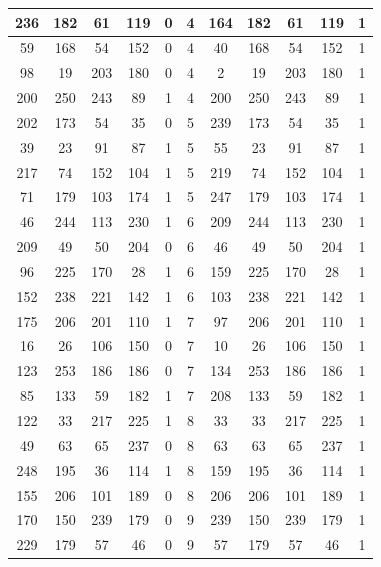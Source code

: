\documentclass[12pt]{jreport}
\begin{document}
\begin{table}[H]
\begin{center}
\begin{tabular} {|c|c|c|c|c|c|c|c|c|c|c|}
                    236 & 182 & 61 & 119 & 0 & 4 & 164 & 182 & 61 & 119 & 1 \\ \hline
                    59 & 168 & 54 & 152 & 0 & 4 & 40 & 168 & 54 & 152 & 1 \\ \hline
                    98 & 19 & 203 & 180 & 0 & 4 & 2 & 19 & 203 & 180 & 1 \\ \hline
                    200 & 250 & 243 & 89 & 1 & 4 & 200 & 250 & 243 & 89 & 1 \\ \hline

                    202 & 173 & 54 & 35 & 0 & 5 & 239 & 173 & 54 & 35 & 1 \\ \hline
                    39 & 23 & 91 & 87 & 1 & 5 & 55 & 23 & 91 & 87 & 1 \\ \hline
                    217 & 74 & 152 & 104 & 1 & 5 & 219 & 74 & 152 & 104 & 1 \\ \hline
                    71 & 179 & 103 & 174 & 1 & 5 & 247 & 179 & 103 & 174 & 1 \\ \hline

                    46 & 244 & 113 & 230 & 1 & 6 & 209 & 244 & 113 & 230 & 1 \\ \hline
                    209 & 49 & 50 & 204 & 0 & 6 & 46 & 49 & 50 & 204 & 1 \\ \hline
                    96 & 225 & 170 & 28 & 1 & 6 & 159 & 225 & 170 & 28 & 1 \\ \hline
                    152 & 238 & 221 & 142 & 1 & 6 & 103 & 238 & 221 & 142 & 1 \\ \hline

                    175 & 206 & 201 & 110 & 1 & 7 & 97 & 206 & 201 & 110 & 1 \\ \hline
                    16 & 26 & 106 & 150 & 0 & 7 & 10 & 26 & 106 & 150 & 1 \\ \hline
                    123 & 253 & 186 & 186 & 0 & 7 & 134 & 253 & 186 & 186 & 1 \\ \hline
                    85 & 133 & 59 & 182 & 1 & 7 & 208 & 133 & 59 & 182 & 1 \\ \hline

                    122 & 33 & 217 & 225 & 1 & 8 & 33 & 33 & 217 & 225 & 1 \\ \hline
                    49 & 63 & 65 & 237 & 0 & 8 & 63 & 63 & 65 & 237 & 1 \\ \hline
                    248 & 195 & 36 & 114 & 1 & 8 & 159 & 195 & 36 & 114 & 1 \\ \hline
                    155 & 206 & 101 & 189 & 0 & 8 & 206 & 206 & 101 & 189 & 1 \\ \hline

                    170 & 150 & 239 & 179 & 0 & 9 & 239 & 150 & 239 & 179 & 1 \\ \hline
                    229 & 179 & 57 & 46 & 0 & 9 & 57 & 179 & 57 & 46  & 1 \\ \hline
                \end{tabular} \newpage
            \end{center}
        \end{table}
\end{document}
